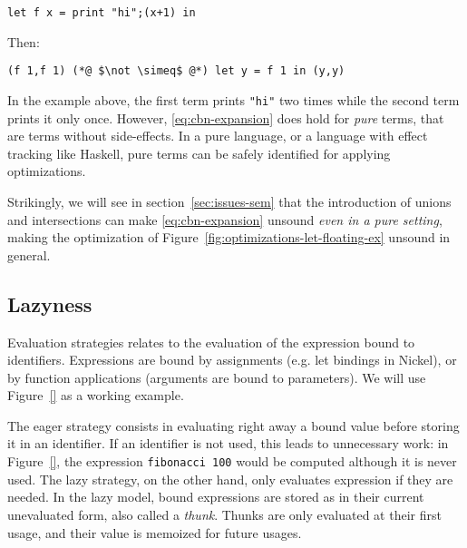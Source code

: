 \documentclass[sigplan,10pt,review,anonymous]{acmart}
\newcommand{\unsure}[2][1=]{}
\newcommand{\nickel}[1]{\lstinline[language=nickel]{#1}}
\begin{document}
\begin{lstlisting}[language=Nickel]
let f x = print "hi";(x+1) in 
\end{lstlisting}

Then:

\begin{lstlisting}[language=Nickel]
(f 1,f 1) (*@ $\not \simeq$ @*) let y = f 1 in (y,y)
\end{lstlisting}

In the example above, the first term prints \nickel{"hi"} two times while the
second term prints it only once. However, \ref{eq:cbn-expansion} does hold for
\emph{pure} terms, that are terms without side-effects. In a pure language, or a
language with effect tracking like Haskell, pure terms can be safely identified for applying
optimizations.

Strikingly, we will see in section~\ref{sec:issues-sem} that the introduction of
unions and intersections can make \ref{eq:cbn-expansion} unsound
\emph{even in a pure setting}, making the optimization of
Figure~\ref{fig:optimizations-let-floating-ex} unsound in general.

\unsure{Should we tease already here that unions and intersections break this
even for pure terms?}

\subsection*{Lazyness}
Evaluation strategies relates to the evaluation of the expression bound to
identifiers. Expressions are bound by assignments (e.g. let bindings in
Nickel), or by function applications (arguments are bound to parameters). We
will use Figure~\ref{} as a working example.

The eager strategy consists in evaluating right away a bound value before
storing it in an identifier. If an identifier is not used, this leads to
unnecessary work: in Figure~\ref{}, the expression \nickel{fibonacci 100} would
be computed although it is never used. The lazy strategy, on the other hand,
only evaluates expression if they are needed. In the lazy model, bound
expressions are stored as in their current unevaluated form, also called a
\emph{thunk}. Thunks are only evaluated at their first usage, and their value is
memoized for future usages.
\end{document}
